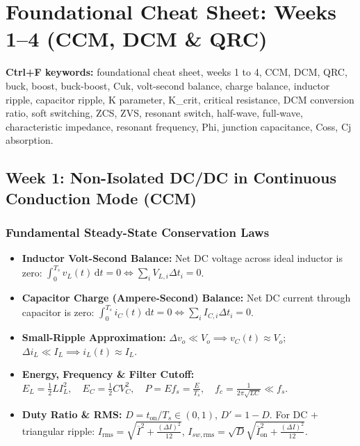 \clearpage
\appendix
\section{Foundational Cheat Sheet: Weeks 1--4 (CCM, DCM \& QRC)}

\noindent\textbf{Ctrl+F keywords:} foundational cheat sheet, weeks 1 to 4, CCM, DCM, QRC, buck, boost, buck-boost, Cuk, volt-second balance, charge balance, inductor ripple, capacitor ripple, K parameter, K\_crit, critical resistance, DCM conversion ratio, soft switching, ZCS, ZVS, resonant switch, half-wave, full-wave, characteristic impedance, resonant frequency, Phi, junction capacitance, Coss, Cj absorption.

\vspace{-3pt}
\subsection{Week 1: Non-Isolated DC/DC in Continuous Conduction Mode (CCM)}
\vspace{-3pt}

\subsubsection*{Fundamental Steady-State Conservation Laws}
\vspace{-4pt}
\begin{itemize}\setlength{\itemsep}{1pt}\setlength{\parskip}{0pt}
  \item \textbf{Inductor Volt-Second Balance:} Net DC voltage across ideal inductor is zero:
  $\int_0^{T_s} v_L(t)\,\mathrm{d}t = 0 \iff \sum_i V_{L,i} \Delta t_i = 0$.
  \item \textbf{Capacitor Charge (Ampere-Second) Balance:} Net DC current through capacitor is zero:
  $\int_0^{T_s} i_C(t)\,\mathrm{d}t = 0 \iff \sum_i I_{C,i} \Delta t_i = 0$.
  \item \textbf{Small-Ripple Approximation:} $\Delta v_o \ll V_o \implies v_C(t) \approx V_o$; $\Delta i_L \ll I_L \implies i_L(t) \approx I_L$.
  \item \textbf{Energy, Frequency \& Filter Cutoff:}
  $E_L = \tfrac{1}{2} L I_L^2, \quad E_C = \tfrac{1}{2} C V_C^2, \quad P = E f_s = \tfrac{E}{T_s}, \quad f_c = \frac{1}{2\pi\sqrt{LC}} \ll f_s$.
  \item \textbf{Duty Ratio \& RMS:} $D = t_{\mathrm{on}}/T_s \in (0, 1)$, $D' = 1 - D$. For DC $+$ triangular ripple:
  $I_{\mathrm{rms}} = \sqrt{\overline{I}^2 + \tfrac{(\Delta I)^2}{12}}$, $I_{sw,\mathrm{rms}} = \sqrt{D} \sqrt{\overline{I}_{\mathrm{on}}^2 + \tfrac{(\Delta I)^2}{12}}$.
\end{itemize}

